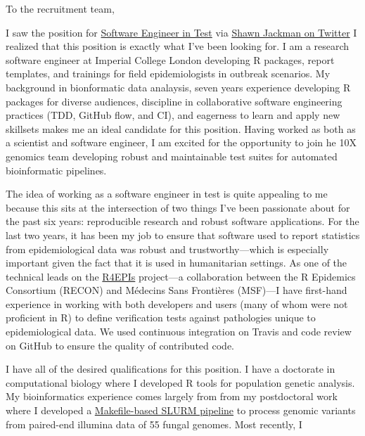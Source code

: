 \vspace{1ex}
To the recruitment team,

\vspace{1ex}

I saw the position for
\href{https://boards.greenhouse.io/10xgenomics/jobs/1769868?gh_jid=1769868#application}{Software
Engineer in Test} via
\href{https://twitter.com/sjackman/status/1189977010908454912?s=20}{Shawn
Jackman on Twitter} I realized that this position is exactly what I've been
looking for. I am a research software engineer at Imperial College London
developing R packages, report templates, and trainings for field
epidemiologists in outbreak scenarios. My background in bionformatic data
analaysis, seven years experience developing R packages for diverse audiences,
discipline in collaborative software engineering practices (TDD, GitHub flow,
and CI), and eagerness to learn and apply new skillsets makes me an ideal
candidate for this position.  Having worked as both as a scientist and software
engineer, I am excited for the opportunity to join he 10X genomics team
developing robust and maintainable test suites for automated bioinformatic
pipelines.

\vspace{1ex}

The idea of working as a software engineer in test is quite appealing to me
because this sits at the intersection of two things I've been passionate about
for the past six years: reproducible research and robust software applications.
For the last two years, it has been my job to ensure that software used to
report statistics from epidemiological data was robust and trustworthy---which
is especially important given the fact that it is used in humanitarian
settings. As one of the technical leads on the
\href{https://r4epis.netlify.com}{R4EPIs} project---a collaboration between the
R Epidemics Consortium (RECON) and M\'{e}decins Sans Fronti\`{e}res (MSF)---I
have first-hand experience in working with both developers and users (many of
whom were not proficient in R) to define verification tests against pathologies
unique to epidemiological data. We used continuous integration on Travis and
code review on GitHub to ensure the quality of contributed code.

\vspace{1ex}

I have all of the desired qualifications for this position. I have a doctorate
in computational biology where I developed R tools for population genetic
analysis. My bioinformatics experience comes largely from from my postdoctoral
work where I developed a
\href{https://github.com/zkamvar/read-processing}{Makefile-based SLURM
pipeline} to process genomic variants from paired-end illumina data of 55
fungal genomes. Most recently, I 


